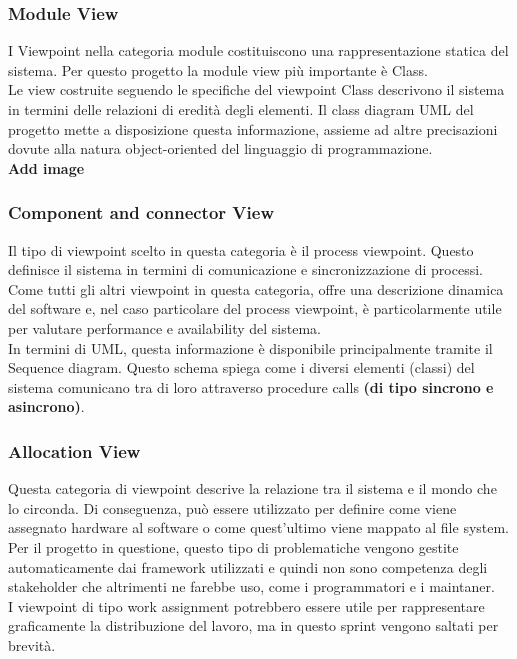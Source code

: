 \documentclass{article}
\begin{document}
\begin{itemize}
\subsubsection{Module View}
I Viewpoint nella categoria module costituiscono una rappresentazione statica del sistema. Per questo progetto la module view più importante è Class. 
\\Le view costruite seguendo le specifiche del viewpoint Class descrivono il sistema in termini delle relazioni di eredità degli elementi. Il class diagram UML del progetto mette a disposizione questa informazione, assieme ad altre precisazioni dovute alla natura object-oriented del linguaggio di programmazione. 
\\\textbf{Add image}
\subsubsection{Component and connector View}
Il tipo di viewpoint scelto in questa categoria è il process viewpoint. Questo definisce il sistema in termini di comunicazione e sincronizzazione di processi. 
\\Come tutti gli altri viewpoint in questa categoria, offre una descrizione dinamica del software e, nel caso particolare del process viewpoint, è particolarmente utile per valutare performance e availability del sistema. 
\\In termini di UML, questa informazione è disponibile principalmente tramite il Sequence diagram. Questo schema spiega come i diversi elementi (classi) del sistema comunicano tra di loro attraverso procedure calls \textbf{(di tipo sincrono e asincrono)}.
\subsubsection{Allocation View}
Questa categoria di viewpoint descrive la relazione tra il sistema e il mondo che lo circonda. Di conseguenza, può essere utilizzato per definire come viene assegnato hardware al software o come quest’ultimo viene mappato al file system. 
\\Per il progetto in questione, questo tipo di problematiche vengono gestite automaticamente dai framework utilizzati e quindi non sono competenza degli stakeholder che altrimenti ne farebbe uso, come i programmatori e i maintaner.
\\I viewpoint di tipo work assignment potrebbero essere utile per rappresentare graficamente la distribuzione del lavoro, ma in questo sprint vengono saltati per brevità. 


\end{itemize}
\end{document}

